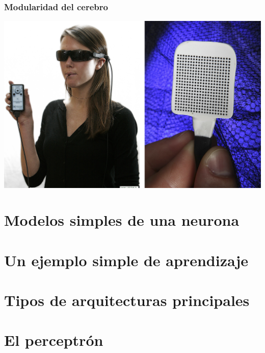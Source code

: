 \documentclass{beamer}
\begin{document}
\begin{frame}
  \frametitle{Modularidad del cerebro}
  \includegraphics[width=\textwidth]{ver_lengua.jpg}  
\end{frame}



\section{Modelos simples de una neurona}


\section{Un ejemplo simple de aprendizaje}

\section{Tipos de arquitecturas principales}


\section{El perceptrón}
\end{document}
